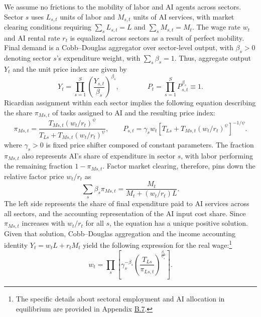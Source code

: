 \documentclass[11pt]{article}
\begin{document}
We assume no frictions to the mobility of labor and AI agents across
sectors. Sector $s$ uses $L_{s,t}$ units of labor and $M_{s,t}$
units of AI services, with market clearing conditions requiring $\sum_{s}L_{s,t}=L$
and $\sum_{s}M_{s,t}=M_{t}$. The wage rate $w_{t}$ and AI rental
rate $r_{t}$ is equalized across sectors as a result of perfect mobility.
Final demand is a Cobb--Douglas aggregator over sector-level output,
with $\beta_{s}>0$ denoting sector $s$'s expenditure weight, with
$\sum_{s}\beta_{s}=1$. Thus, aggregate output $Y_{t}$ and the unit
price index are given by
\begin{equation}
Y_{t}=\prod^{S}_{s=1}\left(\frac{Y_{s,t}}{\beta_{s}}\right)^{\beta_{s}},\qquad\qquad P_{t}=\prod^{S}_{s=1}P^{\beta_{s}}_{s,t}\equiv1.\label{eq:multisector-final-good}
\end{equation}
Ricardian assignment within each sector implies the following equation
describing the share $\pi_{Ms,t}$ of tasks assigned to AI and the
resulting price index:
\begin{equation}
\pi_{Ms,t}=\frac{T_{Ms,t}(w_{t}/r_{t})^{\psi}}{T_{Ls}+T_{Ms,t}(w_{t}/r_{t})^{\psi}},\qquad P_{s,t}=\gamma_{s}w_{t}\left[T_{Ls}+T_{Ms,t}(w_{t}/r_{t})^{\psi}\right]^{-1/\psi}.\label{eq:sectoral-ai-share}
\end{equation}
where $\gamma_{s}>0$ is fixed price shifter composed of constant
parameters. The fraction $\pi_{Ms,t}$ also represents AI's share
of expenditure in sector $s$, with labor performing the remaining
fraction $1-\pi_{Ms,t}$. Factor market clearing, therefore, pins
down the relative factor price $w_{t}/r_{t}$ as
\begin{equation}
\sum_{s}\beta_{s}\pi_{Ms,t}=\frac{M_{t}}{M_{t}+(w_{t}/r_{t})L}.\label{eq:multisector-clearing}
\end{equation}
The left side represents the share of final expenditure paid to AI
services across all sectors, and the accounting representation of
the AI input cost share. Since $\pi_{Ms,t}$ increases with $w_{t}/r_{t}$
for all $s$, the equation has a unique positive solution. Given that
solution, Cobb--Douglas aggregation and the income accounting identity
$Y_{t}=w_{t}L+r_{t}M_{t}$ yield the following expression for the
real wage:\footnote{The specific details about sectoral employment and AI allocation in
equilibrium are provided in Appendix \href{https://ahmadlp.github.io/Lashkaripour_AI_Displacement_Online_Appendix.pdf\#page=36}{B.7}.}
\begin{equation}
w_{t}=\prod_{s}\left[\gamma^{-\beta_{s}}_{s}\left(\frac{T_{Ls}}{\pi_{Ls,t}}\right)^{\frac{\beta_{s}}{\psi_{s}}}\right].\label{eq:multisector-wage-output}
\end{equation}
\end{document}
